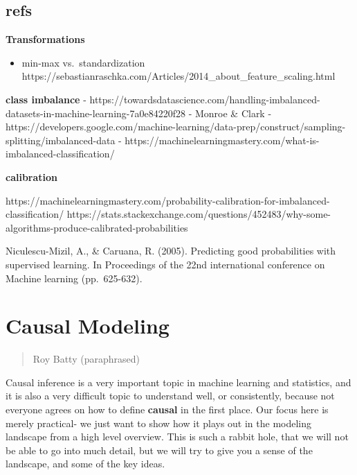\documentclass[
  letterpaper,
]{krantz}
\providecommand{\tightlist}{%
  \setlength{\itemsep}{0pt}\setlength{\parskip}{0pt}}\usepackage{longtable,booktabs,array}
\begin{document}
\section{refs}\label{refs-4}

\textbf{Transformations}

\begin{itemize}
\tightlist
\item
  min-max vs.~standardization
  https://sebastianraschka.com/Articles/2014\_about\_feature\_scaling.html
\end{itemize}

\textbf{class imbalance} -
https://towardsdatascience.com/handling-imbalanced-datasets-in-machine-learning-7a0e84220f28
- Monroe \& Clark -
https://developers.google.com/machine-learning/data-prep/construct/sampling-splitting/imbalanced-data
- https://machinelearningmastery.com/what-is-imbalanced-classification/

\textbf{calibration}

https://machinelearningmastery.com/probability-calibration-for-imbalanced-classification/
https://stats.stackexchange.com/questions/452483/why-some-algorithms-produce-calibrated-probabilities

Niculescu-Mizil, A., \& Caruana, R. (2005). Predicting good
probabilities with supervised learning. In Proceedings of the 22nd
international conference on Machine learning (pp.~625-632).

\chapter{Causal Modeling}\label{causal-modeling}

\begin{quote}
\begin{description}
\tightlist
\item[All those causal effects will be lost in time, like tears in
rain\ldots{} without adequate counterfactual considerations.]
Roy Batty (paraphrased)
\end{description}
\end{quote}

Causal inference is a very important topic in machine learning and
statistics, and it is also a very difficult topic to understand well, or
consistently, because not everyone agrees on how to define
\textbf{causal} in the first place. Our focus here is merely practical-
we just want to show how it plays out in the modeling landscape from a
high level overview. This is such a rabbit hole, that we will not be
able to go into much detail, but we will try to give you a sense of the
landscape, and some of the key ideas.
\end{document}
